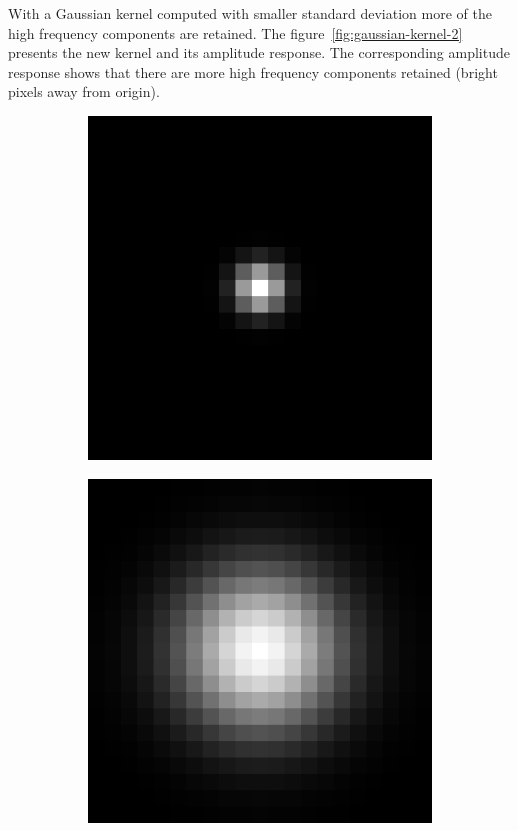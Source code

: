 \documentclass[]{article}
\begin{document}
With a Gaussian kernel computed with smaller standard deviation more of the high
frequency components are retained. The figure~\ref{fig:gaussian-kernel-2}
presents the new kernel and its amplitude response. The corresponding amplitude
response shows that there are more high frequency components retained (bright
pixels away from origin).
\begin{figure}
  \label{fig:gaussian-kernel-2}
  \centering
    \begin{subfigure}[t]{0.49\textwidth}
      \centering
      \includegraphics[width=0.99\linewidth]{kernel2.png}
    \end{subfigure}
    \begin{subfigure}[t]{0.49\textwidth}
      \centering
      \includegraphics[width=0.99\linewidth]{freq2.png}

\end{subfigure}
\end{figure}
\end{document}

